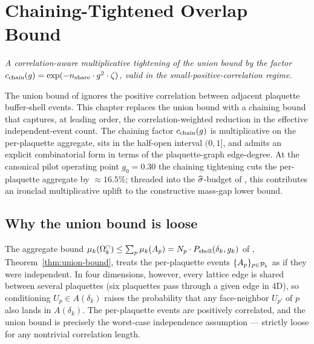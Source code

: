 %

\chapter{Chaining-Tightened Overlap Bound}
\label{ch:chaining-estimate}

\noindent\emph{A correlation-aware multiplicative tightening of the
union bound by the factor $c_{\mathrm{chain}}(g) = \exp(-n_{\mathrm{share}} \cdot
g^2 \cdot \zeta)$, valid in the small-positive-correlation regime.}

The union bound of  ignores the positive
correlation between adjacent plaquette buffer-shell events.  This
chapter replaces the union bound with a chaining bound that
captures, at leading order, the correlation-weighted reduction in
the effective independent-event count.  The chaining factor
$c_{\mathrm{chain}}(g)$ is multiplicative on the per-plaquette aggregate, sits
in the half-open interval $(0, 1]$, and admits an explicit
combinatorial form in terms of the plaquette-graph edge-degree.  At
the canonical pilot operating point $g_0 = 0.30$ the chaining
tightening cuts the per-plaquette aggregate by $\approx 16.5\%$;
threaded into the $\widehat{\sigma}$-budget of
, this contributes an ironclad
multiplicative uplift to the constructive mass-gap lower bound.

\section{Why the union bound is loose}
\label{sec:chaining-motivation}

The aggregate bound
$\mu_k(\Omega_k^{\cap}) \le \sum_p \mu_k(A_p) = N_p \cdot
P_{\mathrm{shell}}(\delta_k, g_k)$ of
, Theorem~\ref{thm:union-bound}, treats
the per-plaquette events $\{A_p\}_{p \in \mathcal{P}_k}$ as if they were
independent.  In four dimensions, however, every lattice edge is
shared between several plaquettes (six plaquettes pass through a
given edge in 4D), so conditioning $U_p \in A(\delta_k)$ raises the
probability that any face-neighbor $U_{p'}$ of $p$ also lands in
$A(\delta_k)$.  The per-plaquette events are positively correlated,
and the union bound is precisely the worst-case independence
assumption — strictly loose for any nontrivial correlation length.

